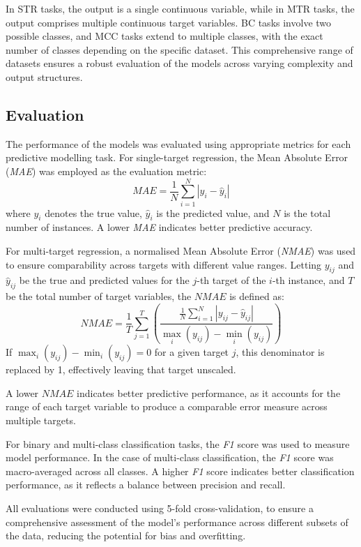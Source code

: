 \documentclass[3p,review,authoryear]{elsarticle}
\begin{document}
In STR tasks, the output is a single continuous variable, while in MTR tasks, the output comprises multiple continuous target variables.
BC tasks involve two possible classes, and MCC tasks extend to multiple classes, with the exact number of classes depending on the specific dataset.
This comprehensive range of datasets ensures a robust evaluation of the models across varying complexity and output structures.  


\subsection{Evaluation}

The performance of the models was evaluated using appropriate metrics for each predictive modelling task. For single-target regression, the Mean Absolute Error (\textit{MAE}) was employed as the evaluation metric:
\[
\textit{MAE} = \frac{1}{N} \sum_{i=1}^{N} \left| y_i - \hat{y}_i \right|
\]
where \( y_i \) denotes the true value, \(\hat{y}_i\) is the predicted value, and \(N\) is the total number of instances. A lower \textit{MAE} indicates better predictive accuracy.

For multi-target regression, a normalised Mean Absolute Error (\textit{NMAE}) was used to ensure comparability across targets with different value ranges. Letting \(y_{ij}\) and \(\hat{y}_{ij}\) be the true and predicted values for the \(j\)-th target of the \(i\)-th instance, and \(T\) be the total number of target variables, the \(\textit{NMAE}\) is defined as:
\[
\textit{NMAE} = \frac{1}{T} \sum_{j=1}^{T} \left( \frac{\frac{1}{N} \sum_{i=1}^{N} | y_{ij} - \hat{y}_{ij} |}{\max_i(y_{ij}) - \min_i(y_{ij})} \right)
\]
If \(\max_i(y_{ij}) - \min_i(y_{ij}) = 0\) for a given target \(j\), this denominator is replaced by 1, effectively leaving that target unscaled.

A lower \(\textit{NMAE}\) indicates better predictive performance, as it accounts for the range of each target variable to produce a comparable error measure across multiple targets.


For binary and multi-class classification tasks, the \textit{F1} score was used to measure model performance.
In the case of multi-class classification, the \textit{F1} score was macro-averaged across all classes.
A higher \textit{F1} score indicates better classification performance, as it reflects a balance between precision and recall.

All evaluations were conducted using 5-fold cross-validation, to ensure a comprehensive assessment of the model's performance across different subsets of the data, reducing the potential for bias and overfitting.
\end{document}
